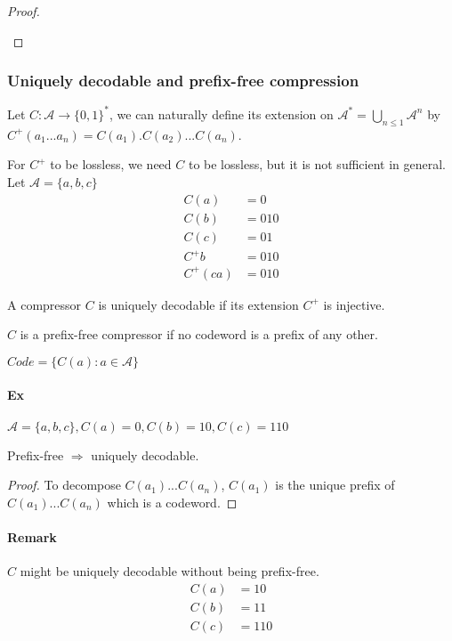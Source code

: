 \begin{proof}
\begin{itemize}
\end{itemize}
\end{proof}


\subsubsection{Uniquely decodable and prefix-free compression}

Let $C:\mathcal{A}\to \{0,1\}^*$, we can naturally define its extension on $\mathcal{A}^*=\bigcup\limits_{n\leq 1} \mathcal{A}^n$ by $C^+(a_1...a_n)=C(a_1).C(a_2)...C(a_n)$.

For $C^+$ to be lossless, we need $C$ to be lossless, but it is not sufficient in general. Let $\mathcal{A}=\{a,b,c\}$
\begin{align*}
C(a) & =0\\
C(b)&=010\\
C(c) &= 01\\
C^+b &=010\\
C^+(ca)&=010
\end{align*}

\begin{defi}
A compressor $C$ is uniquely decodable if its extension $C^+$ is injective.
\end{defi}

\begin{defi}
$C$ is a prefix-free compressor if no codeword is a prefix of any other.
\end{defi}

$Code=\{C(a):a\in \mathcal{A}\}$

\paragraph{Ex} $\mathcal{A}=\{a,b,c\}, C(a)=0, C(b)=10, C(c)=110$

\begin{prop}
Prefix-free $\Rightarrow$ uniquely decodable.
\end{prop}

\begin{proof}
To decompose $C(a_1)...C(a_n)$, $C(a_1)$ is the unique prefix of $C(a_1)...C(a_n)$ which is a codeword.
\end{proof}

\paragraph{Remark} $C$ might be uniquely decodable without being prefix-free.
\begin{align*}
C(a) & = 10\\
C(b) & = 11\\
C(c) & = 110
\end{align*}

